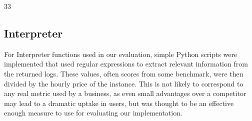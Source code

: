 33\documentclass{article}
\begin{document}
\subsection{Interpreter}
For Interpreter functions used in our evaluation, simple Python scripts were implemented that used regular expressions to extract relevant information from the returned logs. These values, often scores from some benchmark, were then divided by the hourly price of the instance.
This is not likely to correspond to any real metric used by a business, as even small advantages over a competitor may lead to a dramatic uptake in users, but was thought to be an effective enough measure to use for evaluating our implementation.


\newpage

\end{document}
